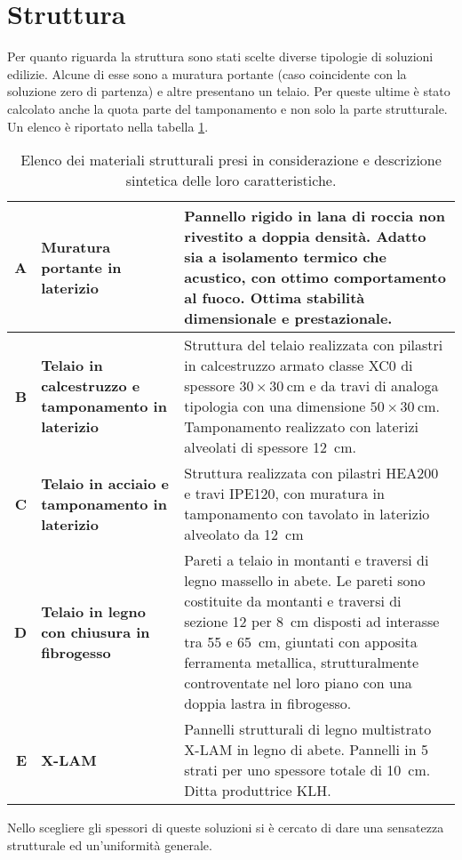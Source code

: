 \section{Struttura}
Per quanto riguarda la struttura sono stati scelte diverse tipologie di soluzioni edilizie. 
Alcune di esse sono a muratura portante (caso coincidente con la soluzione zero di partenza) e altre presentano un telaio. 
Per queste ultime è stato calcolato anche la quota parte del tamponamento e non solo la parte strutturale. 
Un elenco è riportato nella tabella \ref{MaterialiStruttura}.
\begin{table}[htbp]
\caption{Elenco dei materiali strutturali presi in considerazione e descrizione sintetica delle loro caratteristiche.}
\label{MaterialiStruttura}
\centering
\begin{tabularx}{\textwidth}{rXX}
    \toprule
        \textbf{A} & \textbf{Muratura portante in laterizio} & Pannello rigido in lana di roccia non rivestito a doppia densità. 
        Adatto sia a isolamento termico che acustico, con ottimo comportamento al fuoco. 
        Ottima stabilità dimensionale e prestazionale. \\\midrule
        \textbf{B} & \textbf{Telaio in calcestruzzo e tamponamento in laterizio} & Struttura del telaio realizzata con pilastri in calcestruzzo armato classe XC0 di spessore $30\times\SI{30}{\centi\meter}$ e da travi di analoga tipologia con una dimensione $50\times\SI{30}{\centi\meter}$. Tamponamento realizzato con laterizi alveolati di spessore \SI{12}{\centi\meter}. \\\midrule
        \textbf{C} & \textbf{Telaio in acciaio e tamponamento in laterizio} & Struttura realizzata con pilastri HEA200 e travi IPE120, con muratura in tamponamento con tavolato in laterizio alveolato da \SI{12}{\centi\meter}\\\midrule
        \textbf{D} & \textbf{Telaio in legno con chiusura in fibrogesso} & Pareti a telaio in montanti e traversi di legno massello in abete. Le pareti sono costituite da montanti e traversi di sezione 12 per \SI{8}{\centi\meter} disposti ad interasse tra 55 e \SI{65}{\centi\meter}, giuntati con apposita ferramenta metallica, strutturalmente controventate nel loro piano con una doppia lastra in fibrogesso. \\\midrule
        \textbf{E} & \textbf{X-LAM} & Pannelli strutturali di legno multistrato X-LAM in legno di abete. Pannelli in 5 strati per uno spessore totale di \SI{10}{\centi\meter}. Ditta produttrice KLH.\\
    \bottomrule
\end{tabularx}
\end{table}
Nello scegliere gli spessori di queste soluzioni si è cercato di dare una sensatezza strutturale ed un'uniformità generale.

